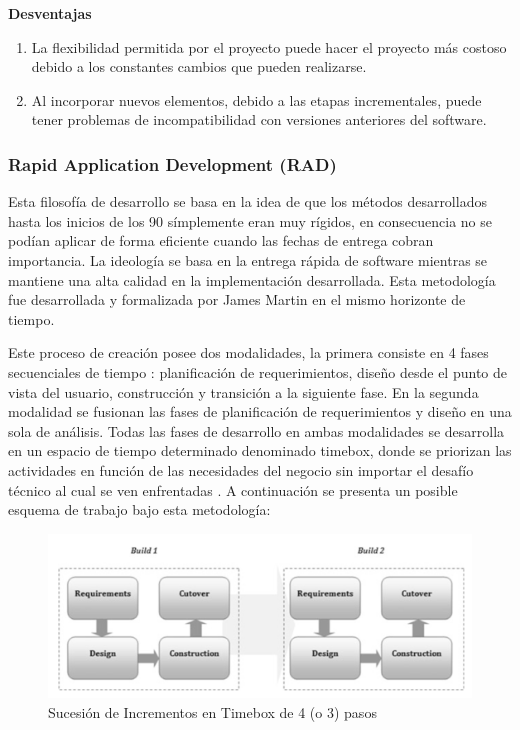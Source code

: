 \textbf{Desventajas}
\begin{enumerate}
  \item La flexibilidad permitida por el proyecto puede hacer el proyecto más costoso debido a los constantes cambios que pueden realizarse.
  \item Al  incorporar nuevos elementos, debido a las etapas incrementales, puede tener problemas de incompatibilidad con versiones anteriores del software.
\end{enumerate}

\subsubsection{Rapid Application Development (RAD) \label{sec:incremental_model}}
Esta filosofía de desarrollo se basa en la idea de que los métodos desarrollados hasta los inicios de los 90 símplemente eran muy rígidos, en consecuencia no se podían aplicar de forma eficiente cuando las fechas de entrega cobran importancia. La ideología se basa en la  entrega rápida de software mientras se mantiene una alta calidad en la implementación desarrollada. Esta metodología fue desarrollada y formalizada por James Martin en el mismo horizonte de tiempo.

Este proceso de creación posee dos modalidades, la primera consiste en 4 fases secuenciales de tiempo : planificación de requerimientos, diseño desde el punto de vista del usuario, construcción y transición a la siguiente fase. En la segunda modalidad se fusionan las fases de planificación de requerimientos y diseño en una sola de análisis. Todas las fases de desarrollo en ambas modalidades se desarrolla en un espacio de tiempo determinado denominado timebox, donde se priorizan las actividades en función de las necesidades del negocio sin importar el desafío técnico al cual se ven enfrentadas \cite{gottesdiener}. A continuación se presenta un posible esquema de trabajo bajo esta metodología:

\begin{figure}[ht]
	\begin{center}
  \includegraphics[width=\textwidth]{./figures/chapter_02/03_succession_of_increments.png}
  \caption{Sucesión de Incrementos en Timebox de 4 (o 3) pasos}
  \label{fig:succession_of_increments}
	\end{center}
\end{figure}

